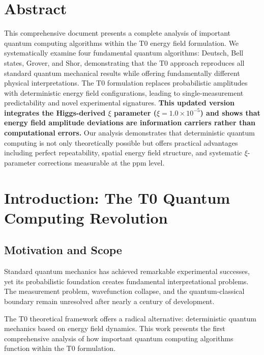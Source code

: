 \section*{Abstract}
		This comprehensive document presents a complete analysis of important quantum computing algorithms within the T0 energy field formulation. We systematically examine four fundamental quantum algorithms: Deutsch, Bell states, Grover, and Shor, demonstrating that the T0 approach reproduces all standard quantum mechanical results while offering fundamentally different physical interpretations. The T0 formulation replaces probabilistic amplitudes with deterministic energy field configurations, leading to single-measurement predictability and novel experimental signatures. \textbf{This updated version integrates the Higgs-derived $\xi$ parameter ($\xi = 1.0 \times 10^{-5}$) and shows that energy field amplitude deviations are information carriers rather than computational errors.} Our analysis demonstrates that deterministic quantum computing is not only theoretically possible but offers practical advantages including perfect repeatability, spatial energy field structure, and systematic $\xi$-parameter corrections measurable at the ppm level.

	
	
	\section{Introduction: The T0 Quantum Computing Revolution}
	
	\subsection{Motivation and Scope}
	
	Standard quantum mechanics has achieved remarkable experimental successes, yet its probabilistic foundation creates fundamental interpretational problems. The measurement problem, wavefunction collapse, and the quantum-classical boundary remain unresolved after nearly a century of development.
	
	The T0 theoretical framework offers a radical alternative: deterministic quantum mechanics based on energy field dynamics. This work presents the first comprehensive analysis of how important quantum computing algorithms function within the T0 formulation.
	
